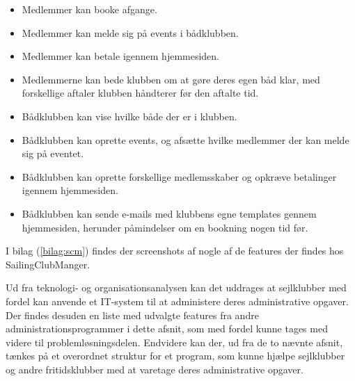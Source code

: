 \begin{itemize}
	\item Medlemmer kan booke afgange.
	\item Medlemmer kan melde sig på events i bådklubben.
	\item Medlemmer kan betale igennem hjemmesiden.
	\item Medlemmerne kan bede klubben om at gøre deres egen båd klar, med forskellige aftaler klubben håndterer
        før den aftalte tid.
	\item Bådklubben kan vise hvilke både der er i klubben.
	\item Bådklubben kan oprette events, og afsætte hvilke medlemmer der kan melde sig på eventet.
	\item Bådklubben kan oprette forskellige medlemsskaber og opkræve betalinger igennem hjemmesiden.
	\item Bådklubben kan sende e-mails med klubbens egne templates gennem hjemmesiden, herunder påmindelser om en
        bookning nogen tid før.
\end{itemize}

I bilag  (\ref{bilag:scm}) findes der screenshots af nogle af de features der findes hos SailingClubManger.

Ud fra teknologi- og organisationsanalysen kan det uddrages at sejlklubber med fordel kan anvende et IT-system til at administere deres administrative opgaver. Der findes desuden en liste med udvalgte features fra andre administrationsprogrammer i dette afsnit, som med fordel kunne tages med videre til problemløsningsdelen. 
Endvidere kan der, ud fra de to nævnte afsnit, tænkes på et overordnet struktur for et program, som kunne hjælpe sejlklubber og andre fritidsklubber med at varetage deres administrative opgaver.  
